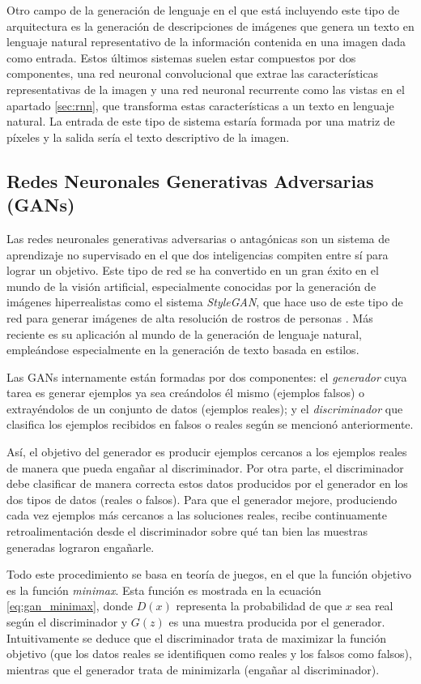 Otro campo de la generación de lenguaje en el que está incluyendo este tipo de arquitectura es la generación de descripciones de imágenes \citep{He2017DeepLF} que genera un texto en lenguaje natural representativo de la información contenida en una imagen dada como entrada. Estos últimos sistemas suelen estar compuestos por dos componentes, una red neuronal convolucional que extrae las características representativas de la imagen y una red neuronal recurrente como las vistas en el apartado \ref{sec:rnn}, que transforma estas características a un texto en lenguaje natural. La entrada de este tipo de sistema estaría formada por una matriz de píxeles y la salida sería el texto descriptivo de la imagen.

\subsection{Redes Neuronales Generativas Adversarias (GANs)}
Las redes neuronales generativas adversarias o antagónicas son un sistema de aprendizaje no supervisado en el que dos inteligencias compiten entre sí para lograr un objetivo. Este tipo de red se ha convertido en un gran éxito en el mundo de la visión artificial, especialmente conocidas por la generación de imágenes hiperrealistas como el sistema \textit{StyleGAN}, que hace uso de este tipo de red para generar imágenes de alta resolución de rostros de personas \citep{Karras2019ASG}. Más reciente es su aplicación al mundo de la generación de lenguaje natural, empleándose especialmente en la generación de texto basada en estilos.

Las GANs internamente están formadas por dos componentes: el \textit{generador} cuya tarea es generar ejemplos ya sea creándolos él mismo (ejemplos falsos) o extrayéndolos de un conjunto de datos (ejemplos reales); y el \textit{discriminador} que clasifica los ejemplos recibidos en falsos o reales según se mencionó anteriormente.

Así, el objetivo del generador es producir ejemplos cercanos a los ejemplos reales de manera que pueda engañar al discriminador. Por otra parte, el discriminador debe clasificar de manera correcta estos datos producidos por el generador en los dos tipos de datos (reales o falsos). Para que el generador mejore, produciendo cada vez ejemplos más cercanos a las soluciones reales, recibe continuamente retroalimentación desde el discriminador sobre qué tan bien las muestras generadas lograron engañarle.


Todo este procedimiento se basa en teoría de juegos, en el que la función objetivo es la función \textit{minimax}. Esta función es mostrada en la ecuación \ref{eq:gan_minimax}, donde $D(x)$ representa la probabilidad de que $x$ sea real según el discriminador y $G(z)$ es una muestra producida por el generador. Intuitivamente se deduce que el discriminador trata de maximizar la función objetivo (que los datos reales se identifiquen como reales y los falsos como falsos), mientras que el generador trata de minimizarla (engañar al discriminador).

